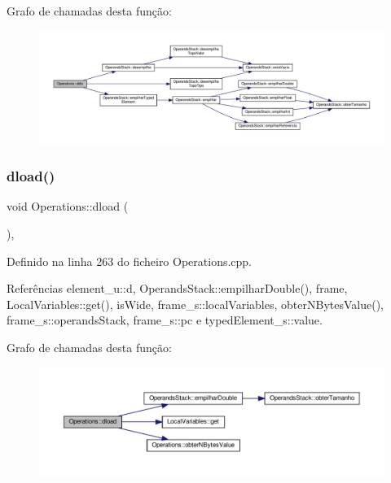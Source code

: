 Grafo de chamadas desta função\+:\nopagebreak
\begin{figure}[H]
\begin{center}
\leavevmode
\includegraphics[width=350pt]{classOperations_a3c323c9f0d40e68bf54cd449a55618c3_cgraph}
\end{center}
\end{figure}
\mbox{\label{classOperations_af53b0b32da7737741c20b4e313eaac84}} 
\subsubsection{\texorpdfstring{dload()}{dload()}}
{\footnotesize\ttfamily void Operations\+::dload (\begin{DoxyParamCaption}{ }\end{DoxyParamCaption})\hspace{0.3cm}{\ttfamily [static]}, {\ttfamily [private]}}



Definido na linha 263 do ficheiro Operations.\+cpp.



Referências element\+\_\+u\+::d, Operands\+Stack\+::empilhar\+Double(), frame, Local\+Variables\+::get(), is\+Wide, frame\+\_\+s\+::local\+Variables, obter\+N\+Bytes\+Value(), frame\+\_\+s\+::operands\+Stack, frame\+\_\+s\+::pc e typed\+Element\+\_\+s\+::value.

Grafo de chamadas desta função\+:\nopagebreak
\begin{figure}[H]
\begin{center}
\leavevmode
\includegraphics[width=350pt]{classOperations_af53b0b32da7737741c20b4e313eaac84_cgraph}
\end{center}
\end{figure}
\mbox{\label{classOperations_a176a81199439e0b22d206c72ea4a1fba}} 
